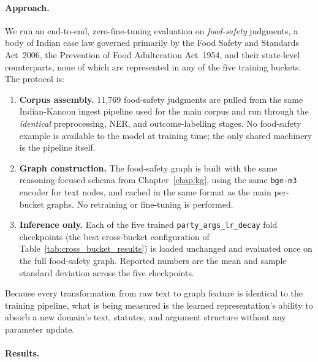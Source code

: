 \paragraph{Approach.}
We run an end-to-end, zero-fine-tuning evaluation on
\emph{food-safety} judgments, a body of Indian case law governed
primarily by the Food Safety and Standards Act~2006, the Prevention
of Food Adulteration Act~1954, and their state-level counterparts,
none of which are represented in any of the five training buckets.
The protocol is:

\begin{enumerate}
  \item \textbf{Corpus assembly.} 11{,}769 food-safety judgments are
    pulled from the same Indian-Kanoon ingest pipeline used for the
    main corpus and run through the \emph{identical} preprocessing,
    NER, and outcome-labelling stages. No food-safety example is
    available to the model at training time; the only shared
    machinery is the pipeline itself.
  \item \textbf{Graph construction.} The food-safety graph is built
    with the same reasoning-focused schema from
    Chapter~\ref{chap:kg}, using the same \texttt{bge-m3} encoder
    for text nodes, and cached in the same format as the main
    per-bucket graphs. No retraining or fine-tuning is performed.
  \item \textbf{Inference only.} Each of the five trained
    \texttt{party\_args\_lr\_decay} fold checkpoints (the best
    cross-bucket configuration of
    Table~\ref{tab:cross_bucket_results}) is loaded unchanged and
    evaluated once on the full food-safety graph. Reported numbers
    are the mean and sample standard deviation across the five
    checkpoints.
\end{enumerate}

Because every transformation from raw text to graph feature is
identical to the training pipeline, what is being measured is the
learned representation's ability to absorb a new domain's text,
statutes, and argument structure without any parameter update.

\paragraph{Results.}

